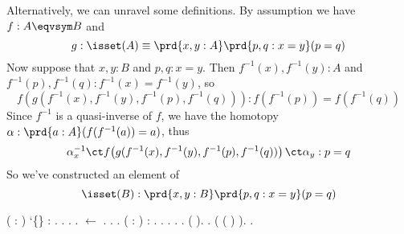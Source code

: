 Alternatively, we can unravel some definitions.  By assumption we have $f : A
\eqvsym B$ and
\[
  g : \isset(A) \equiv \prd{x, y:A}\prd{p,q : x=y} (p = q)
\]
Now suppose that $x, y : B$ and $p, q : x = y$.  Then $f^{-1}(x),
f^{-1}(y) : A$ and $f^{-1}(p), f^{-1}(q) : f^{-1}(x) =
f^{-1}(y)$, so
\[
  f\!\left(g(f^{-1}(x), f^{-1}(y), f^{-1}(p), f^{-1}(q))\right) 
  : 
    f(f^{-1}(p)) = f(f^{-1}(q))
\]
Since $f^{-1}$ is a quasi-inverse of $f$, we have the homotopy $\alpha :
\prd{a:A} (f(f^{-1}(a)) = a)$, thus
\[
  \alpha_{x}^{-1} \ct 
  f\!\left(g(f^{-1}(x), f^{-1}(y), f^{-1}(p), f^{-1}(q))\right) 
  \ct \alpha_{y}
  :
  p = q
\]
So we've constructed an element of
\[
  \isset(B) : \prd{x, y : B} \prd{p, q : x = y} (p = q)
\]
\begin{coqdoccode}
\coqdocemptyline
\coqdocnoindent
{}  (  : ) `\{\} :  \coqdocnotation{\ensuremath{\eqvsym}}       .\coqdoceol
\coqdocnoindent
{}.\coqdoceol
\coqdocindent{1.00em}
  .\coqdoceol
\coqdocindent{1.00em}
   .\coqdoceol
\coqdocindent{1.00em}
 \ensuremath{\leftarrow} .\coqdoceol
\coqdocindent{1.00em}
 .\coqdoceol
\coqdocnoindent
{}.\coqdoceol
\coqdocemptyline
\coqdocnoindent
{}  (  : ) :  \coqdocnotation{\ensuremath{\eqvsym}}       .\coqdoceol
\coqdocnoindent
{}.\coqdoceol
\coqdocindent{1.00em}
    .\coqdoceol
\coqdocindent{1.00em}
 .   .\coqdoceol
\coqdocindent{1.00em}
 (   \coqdocnotation{=}   ).  .\coqdoceol
\coqdocindent{1.00em}
 (\coqdocnotation{(} ( ) ).\coqdoceol
\coqdocnoindent
{}.\coqdoceol
\coqdocemptyline
\end{coqdoccode}
